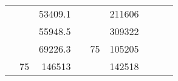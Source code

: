 \begin{table}[H]
\begin{tabular}{|ccrccrccc}
\multicolumn{1}{|c|}{\cellcolor[HTML]{FFFFC7}}                                & \multicolumn{1}{c|}{\cellcolor[HTML]{DAE8FC}}                      & \multicolumn{1}{r|}{\cellcolor[HTML]{DAE8FC}53409.1}   & \multicolumn{1}{c|}{\cellcolor[HTML]{FFFFC7}}                                & \multicolumn{1}{c|}{\cellcolor[HTML]{DAE8FC}}                       & \multicolumn{1}{r|}{\cellcolor[HTML]{DDFDFF}211606}    &                                                                              &                                                                    &                                                        \\ \cline{3-3} \cline{6-6}
\multicolumn{1}{|c|}{\cellcolor[HTML]{FFFFC7}}                                & \multicolumn{1}{c|}{\cellcolor[HTML]{DAE8FC}}                      & \multicolumn{1}{r|}{\cellcolor[HTML]{DDFDFF}55948.5}   & \multicolumn{1}{c|}{\cellcolor[HTML]{FFFFC7}}                                & \multicolumn{1}{c|}{\cellcolor[HTML]{DAE8FC}}                       & \multicolumn{1}{r|}{\cellcolor[HTML]{DAE8FC}309322}    &                                                                              &                                                                    &                                                        \\ \cline{3-3} \cline{6-6}
\multicolumn{1}{|c|}{\cellcolor[HTML]{FFFFC7}}                                & \multicolumn{1}{c|}{\cellcolor[HTML]{DAE8FC}}                      & \multicolumn{1}{r|}{\cellcolor[HTML]{DAE8FC}69226.3}   & \multicolumn{1}{c|}{\cellcolor[HTML]{FFFFC7}}                                & \multicolumn{1}{c|}{\multirow{-10}{*}{\cellcolor[HTML]{DAE8FC}75}}  & \multicolumn{1}{r|}{\cellcolor[HTML]{DDFDFF}105205}    &                                                                              &                                                                    &                                                        \\ \cline{3-3} \cline{5-6}
\multicolumn{1}{|c|}{\cellcolor[HTML]{FFFFC7}}                                & \multicolumn{1}{c|}{\multirow{-10}{*}{\cellcolor[HTML]{DAE8FC}75}} & \multicolumn{1}{r|}{\cellcolor[HTML]{DDFDFF}146513}    & \multicolumn{1}{c|}{\cellcolor[HTML]{FFFFC7}}                                & \multicolumn{1}{c|}{\cellcolor[HTML]{DDFDFF}}                       & \multicolumn{1}{r|}{\cellcolor[HTML]{DAE8FC}142518}    &                                                                              &                                                                    &                                                        \\ \cline{2-3} \cline{6-6}

\end{tabular}
\end{table}
